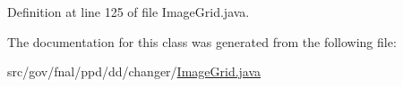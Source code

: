 Definition at line 125 of file Image\-Grid.\-java.



The documentation for this class was generated from the following file\-:\begin{DoxyCompactItemize}
\item 
src/gov/fnal/ppd/dd/changer/\hyperlink{ImageGrid_8java}{Image\-Grid.\-java}\end{DoxyCompactItemize}
